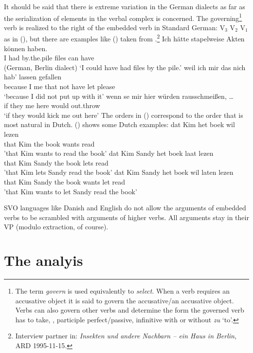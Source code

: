 It should be said that there is extreme variation in the German dialects as far as the serialization
of elements in the verbal complex is concerned. The governing\footnote{
  The term \emph{govern} is used equivalently to \emph{select}. When a verb requires an accusative
  object it is said to govern the accusative/an accusative object. Verbs can also govern other verbs
  and determine the form the governed verb has to take, \eg, participle perfect/passive, infinitive
  with or without \emph{zu} `to'. 
} verb is realized to the right of the
embedded verb in Standard German: V$_3$ V$_2$ V$_1$ as in (), but there are examples like
() taken from .\footnote{
Interview partner in: \emph{Insekten und andere Nachbarn -- ein Haus in Berlin}, ARD 1995-11-15.
}
\eal
\ex 
\gll Ich hätte stapelweise Akten kön\-nen haben.\\
     I   had   by.the.pile files can      have\\\hfill (German, Berlin dialect)
\glt `I could have had files by the pile.'
\ex 
\gll weil ich mir das  nich hab' lassen gefallen\\
     because I me that not  have let    please\\
\glt `because I did not put up with it'
\ex 
\gll wenn se   mir hier würden rausschmeißen, \ldots\\
     if   they me  here would  out.throw\\
\glt `if they would kick me out here'
\zl
The orders in () correspond to the order that is most natural in Dutch. () shows some
Dutch examples: 
\eal
\ex
\gll dat   Kim het boek wil lezen\\
     that  Kim the book wants read\\
\glt 'that Kim wants to read the book' 
\ex
\gll dat  Kim Sandy het boek laat lezen\\
     that Kim Sandy the book lets read\\
\glt 'that Kim lets Sandy read the book'
\ex 
\gll dat Kim Sandy het boek wil laten lezen\\
     that Kim Sandy the book wants let read \\
\glt 'that Kim wants to let Sandy read the book'
\zl

SVO languages like Danish and English do not allow the arguments of embedded verbs to be scrambled
with arguments of higher verbs. All arguments stay in their VP (modulo extraction, of course).


\section{The analyis}


